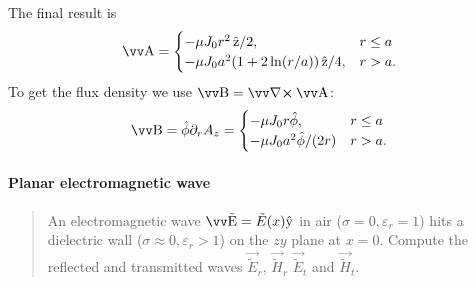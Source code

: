 \documentclass[margin=small]{tex/hsrzf}
\theoremstyle{elmagzf}
\begin{document}
The final result is 
\begin{align*}
  \vec{A} = \begin{cases}
    -\mu J_0 r^2 \, \uvec{z} / 2 ,                   & r \leq a \\
    -\mu J_0 a^2 (1 + 2 \ln (r/a)) \, \uvec{z} / 4 , & r > a.   \\
  \end{cases}
\end{align*}
To get the flux density we use \(\vec{B} = \curl \vec{A}\):
\[
  \vec{B} = \uvec{\phi} \partial_r A_z = \begin{cases}
    -\mu J_0 r \uvec{\phi}, & r \leq a \\
    -\mu J_0 a^2 \uvec{\phi} / (2r) & r > a .\\
  \end{cases}
\]


\paragraph{Planar electromagnetic wave}

\newcommand{\vwave}[1]{\vec{\tilde{#1}}}

\begin{quote}
  An electromagnetic wave \(\vwave{E} = \tilde{E}(x) \uvec{y}\) in air
  (\(\sigma = 0, \varepsilon_r = 1\)) hits a dielectric wall (\(\sigma \approx
  0, \varepsilon_r > 1\)) on the \(zy\) plane at \(x = 0\). Compute the
  reflected and transmitted waves \(\vwave{E}_r\), \(\vwave{H}_r\)
  \(\vwave{E}_t\) and \(\vwave{H}_t\).
\end{quote}
\end{document}
